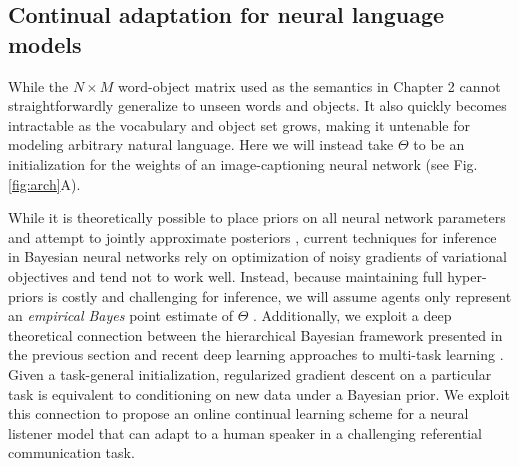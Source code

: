 \subsection{Continual adaptation for neural language models}

While the $N \times M$ word-object matrix used as the semantics in Chapter 2 cannot straightforwardly generalize to unseen words and objects. 
It also quickly becomes intractable as the vocabulary and object set grows, making it untenable for modeling arbitrary natural language.
Here we will instead take $\Theta$ to be an initialization for the weights of an image-captioning neural network (see Fig. \ref{fig:arch}A).

While it is theoretically possible to place priors on all neural network parameters and attempt to jointly approximate posteriors , current techniques for inference in Bayesian neural networks rely on optimization of noisy gradients of variational objectives and tend not to work well. 
Instead, because maintaining full hyper-priors is costly and challenging for inference, we will assume agents only represent an \emph{empirical Bayes} point estimate of $\Theta$ \cite{gelman_bayesian_2014}.
Additionally, we exploit a deep theoretical connection between the hierarchical Bayesian framework presented in the previous section and recent deep learning approaches to multi-task learning \cite{nagabandi_deep_2018,grant_recasting_2018,jerfel_online_2018}. 
Given a task-general initialization, regularized gradient descent on a particular task is equivalent to conditioning on new data under a Bayesian prior.
We exploit this connection to propose an online continual learning scheme for a neural listener model that can adapt to a human speaker in a challenging referential communication task.

